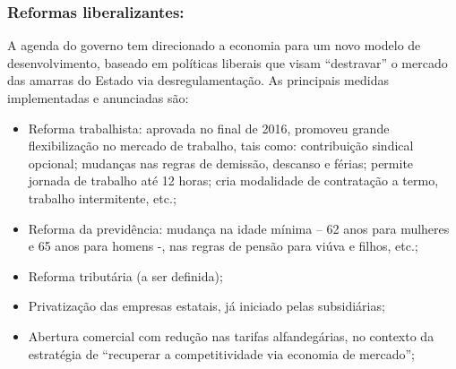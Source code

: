 \documentclass[11pt]{article}
\begin{document}
\subsubsection*{Reformas liberalizantes:}
\label{sec:org3a2197a}

A agenda do governo tem direcionado a economia para um novo modelo de desenvolvimento, baseado em políticas liberais que visam ``destravar'' o mercado das amarras do Estado via desregulamentação.
As principais medidas implementadas e anunciadas são:

\begin{itemize}
\item Reforma trabalhista: aprovada no final de 2016, promoveu grande flexibilização no mercado de trabalho, tais como: contribuição sindical opcional; mudanças nas regras de demissão, descanso e férias; permite jornada de trabalho até 12 horas; cria modalidade de contratação a termo, trabalho intermitente, etc.;
\item Reforma da previdência: mudança na idade mínima – 62 anos para mulheres e 65 anos para homens -, nas regras de pensão para viúva e filhos, etc.;
\item Reforma tributária (a ser definida);
\item Privatização das empresas estatais, já iniciado pelas subsidiárias;
\item Abertura comercial com redução nas tarifas alfandegárias, no contexto da estratégia de “recuperar a competitividade via economia de mercado”;
\end{itemize}
\end{document}
